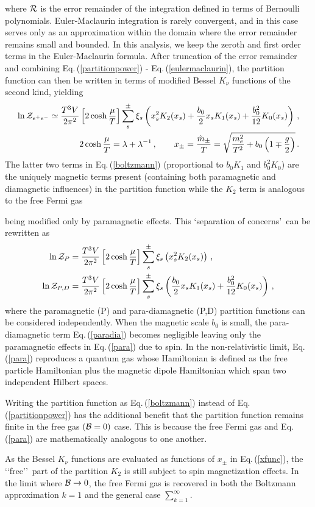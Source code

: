 \documentclass[a4paper]{article}
\newcommand{\req}[1]{Eq.\,(\ref{#1})}
\newcommand*{\xblue}{\color{black}}
\begin{document}
where ${\cal R}$ is the error remainder of the integration defined in terms of Bernoulli polynomials. Euler-Maclaurin integration is rarely convergent, and in this case serves only as an approximation within the domain where the error remainder remains small and bounded. In this analysis, we keep the zeroth and first order terms in the Euler-Maclaurin formula. After truncation of the error remainder and combining \req{partitionpower} - \req{eulermaclaurin}, the partition function can then be written in terms of modified Bessel $K_{\nu}$ functions of the second kind, yielding
\begin{align}
    \label{boltzmann}
    \ln{\cal Z}_{e^{+}e^{-}}\simeq\frac{T^{3}V}{2\pi^{2}}\left[2\cosh{\frac{\mu}{T}}\right]\sum_{s}^{\pm}\xi_{s}\left(x_{s}^{2}K_{2}(x_{s})+\frac{b_{0}}{2}x_{s}K_{1}(x_{s})+\frac{b_{0}^{2}}{12}K_{0}(x_{s})\right)\,,\\
    \label{xfunc}
    2\cosh{\frac{\mu}{T}}=\lambda+\lambda^{-1}\,,\qquad
    x_{\pm}=\frac{{\tilde m}_{\pm}}{T}=\sqrt{\frac{m_{e}^{2}}{T^{2}}+b_{0}\left(1\mp\frac{g}{2}\right)}\,.
\end{align}
The latter two terms in \req{boltzmann} (proportional to $b_{0}K_{1}$ and $b_{0}^{2}K_{0}$) are the uniquely magnetic terms present (containing both paramagnetic and diamagnetic influences) in the partition function while the $K_{2}$ term is analogous to the free Fermi gas~\cite{greiner2012thermodynamics} {\xblue being modified only by paramagnetic effects. This \lq separation of concerns\rq\ can be rewritten as
\begin{align}
    \label{para}
    \ln{\cal Z}_{P}&=\frac{T^{3}V}{2\pi^{2}}\left[2\cosh{\frac{\mu}{T}}\right]\sum_{s}^{\pm}\xi_{s}\left(x_{s}^{2}K_{2}(x_{s})\right)\,,\\
    \label{paradia}
    \ln{\cal Z}_{P,D}&=\frac{T^{3}V}{2\pi^{2}}\left[2\cosh{\frac{\mu}{T}}\right]\sum_{s}^{\pm}\xi_{s}\left(\frac{b_{0}}{2}x_{s}K_{1}(x_{s})+\frac{b_{0}^{2}}{12}K_{0}(x_{s})\right)\,,
\end{align}
where the paramagnetic (P) and para-diamagnetic (P,D) partition functions can be considered independently. When the magnetic scale $b_{0}$ is small, the para-diamagnetic term \req{paradia} becomes negligible leaving only the paramagnetic effects in \req{para} due to spin. In the non-relativistic limit, \req{para} reproduces a quantum gas whose Hamiltonian is defined as the free particle Hamiltonian plus the magnetic dipole Hamiltonian which span two independent Hilbert spaces.

Writing the partition function as \req{boltzmann} instead of \req{partitionpower} has the additional benefit that the partition function remains finite in the free gas $({\cal B}=0)$ case. This is because the free Fermi gas and \req{para} are mathematically analogous to one another.} As the Bessel $K_{\nu}$ functions are evaluated as functions of $x_{\pm}$ in \req{xfunc}, the \lq\lq free\rq\rq\ part of the partition $K_{2}$ is still subject to spin magnetization effects. In the limit where ${\cal B}\rightarrow0$, the free Fermi gas is recovered in both the Boltzmann approximation $k=1$ and the general case $\sum_{k=1}^{\infty}$.
\end{document}
